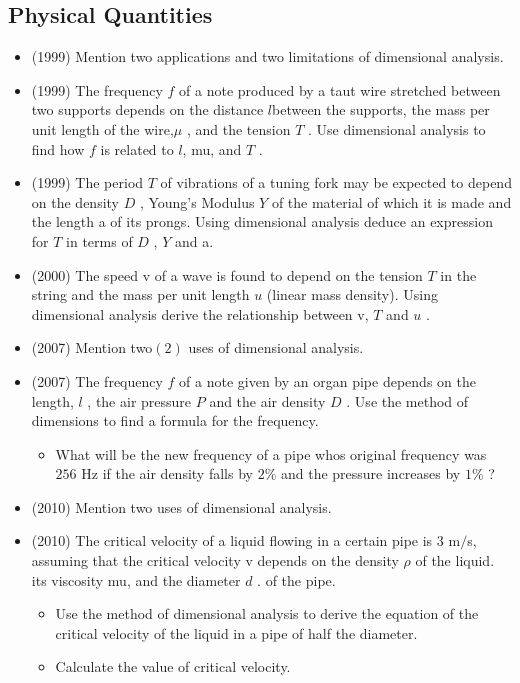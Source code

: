 \documentclass{article}
\begin{document}
\subsection{Physical Quantities}
\begin{itemize}
\item (1999)  Mention two applications and two limitations of dimensional analysis.
\item (1999)  The frequency $ f$ of a note produced by a taut wire stretched between two supports depends on the distance ​ $ l$ ​ between the supports, the mass per unit length of the wire,$ \mu $ , and the tension $ T$ . Use dimensional analysis to find how $ f$ is related to ​ $ l$ ​ , mu, and $ T$ .
\item (1999)  The period $ T$ of vibrations of a tuning fork may be expected to depend on the density $ D$ , Young's Modulus $ Y$ of the material of which it is made and the length a of its prongs. Using dimensional analysis deduce an expression for $ T$ in terms of $ D$ , $ Y$ and a.
\item (2000)  The speed v of a wave is found to depend on the tension $ T$ in the string and the mass per unit length $ u$ (linear mass density). Using dimensional analysis derive the relationship between v, $ T$ and $ u$ .
\item (2007)  Mention two$ (2)$ uses of dimensional analysis.
\item (2007)  The frequency $ f$ of a note given by an organ pipe depends on the length, $ l$ , the air pressure $ P$ and the air density $ D$ .  Use the method of dimensions to find a formula for the frequency.\begin{itemize}
\item What will be the new frequency of a pipe whos original frequency was $ 256$ Hz if the air density falls by $ 2\%$ and the pressure increases by $ 1\%$ ?
\end{itemize}
\item (2010)  Mention two uses of dimensional analysis.
\item (2010)  The critical velocity of a liquid flowing in a certain pipe is $ 3$ m$/$s, assuming that the critical velocity v depends on the density $ \rho $ of the liquid. its viscosity mu, and the diameter $ d$ . of the pipe. \begin{itemize}
\item Use the method of dimensional analysis to derive the equation of the critical velocity of the liquid in a pipe of half the diameter.
\item Calculate the value of critical velocity.

\end{itemize}
\end{itemize}
\end{document}
